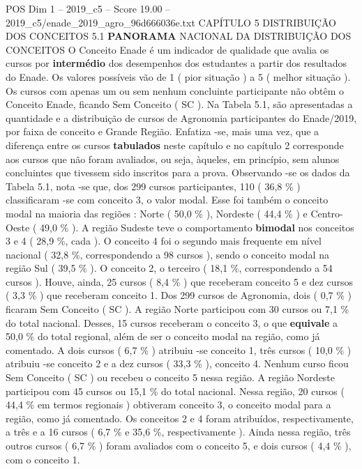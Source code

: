 \begin{textsample}{POS Dim 1 – 2019\_c5 – Score 19.00 – 2019\_c5/enade\_2019\_agro\_96d666036e.txt}  \label{ex:f1_pos_041}
CAPÍTULO 5 DISTRIBUIÇÃO DOS CONCEITOS 5.1 \textbf{PANORAMA} NACIONAL DA DISTRIBUIÇÃO DOS CONCEITOS O Conceito Enade é um indicador de qualidade que avalia os cursos por \textbf{intermédio} dos desempenhos dos estudantes a partir dos resultados do Enade.
Os valores possíveis vão de 1 ( pior situação ) a 5 ( melhor situação ).
Os cursos com apenas um ou sem nenhum concluinte participante não obtêm o Conceito Enade, ficando Sem Conceito ( SC ).
Na Tabela 5.1, são apresentadas a quantidade e a distribuição de cursos de Agronomia participantes do Enade/2019, por faixa de conceito e Grande Região.
Enfatiza -se, mais uma vez, que a diferença entre os cursos \textbf{tabulados} neste capítulo e no capítulo 2 corresponde aos cursos que não foram avaliados, ou seja, àqueles, em princípio, sem alunos concluintes que tivessem sido inscritos para a prova.
Observando -se os dados da Tabela 5.1, nota -se que, dos 299 cursos participantes, 110 ( 36,8 \% ) classificaram -se com conceito 3, o valor modal.
Esse foi também o conceito modal na maioria das regiões : Norte ( 50,0 \% ), Nordeste ( 44,4 \% ) e Centro-Oeste ( 49,0 \% ).
A região Sudeste teve o comportamento \textbf{bimodal} nos conceitos 3 e 4 ( 28,9 \%, cada ).
O conceito 4 foi o segundo mais frequente em nível nacional ( 32,8 \%, correspondendo a 98 cursos ), sendo o conceito modal na região Sul ( 39,5 \% ).
O conceito 2, o terceiro ( 18,1 \%, correspondendo a 54 cursos ).
Houve, ainda, 25 cursos ( 8,4 \% ) que receberam conceito 5 e dez cursos ( 3,3 \% ) que receberam conceito 1.
Dos 299 cursos de Agronomia, dois ( 0,7 \% ) ficaram Sem Conceito ( SC ).
A região Norte participou com 30 cursos ou 7,1 \% do total nacional.
Desses, 15 cursos receberam o conceito 3, o que \textbf{equivale} a 50,0 \% do total regional, além de ser o conceito modal na região, como já comentado.
A dois cursos ( 6,7 \% ) atribuiu -se conceito 1, três cursos ( 10,0 \% ) atribuiu -se conceito 2 e a dez cursos ( 33,3 \% ), conceito 4.
Nenhum curso ficou Sem Conceito ( SC ) ou recebeu o conceito 5 nessa região.
A região Nordeste participou com 45 cursos ou 15,1 \% do total nacional.
Nessa região, 20 cursos ( 44,4 \% em termos regionais ) obtiveram conceito 3, o conceito modal para a região, como já comentado.
Os conceitos 2 e 4 foram atribuídos, respectivamente, a três e a 16 cursos ( 6,7 \% e 35,6 \%, respectivamente ).
Ainda nessa região, três outros cursos ( 6,7 \% ) foram avaliados com o conceito 5, e dois cursos ( 4,4 \% ), com o conceito 1.

\end{textsample}
